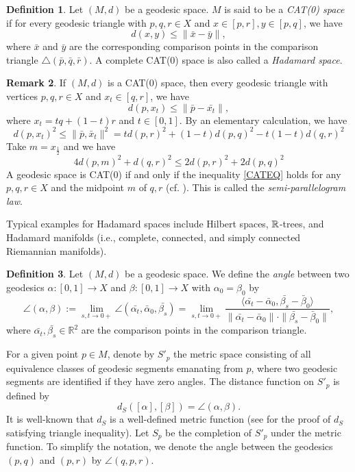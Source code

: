 \documentclass[11pt]{article}
\theoremstyle{definition}
\newtheorem{Def}{Definition}[section]
\newtheorem{Rem}[Def]{Remark}
\theoremstyle{plain}
\begin{document}
\begin{Def}
Let $(M,d)$ be a geodesic space. $M$ is said to be a \emph{CAT(0) space} if for every geodesic triangle with $p,q,r\in X$ and $x\in[p,r],y\in[p,q]$, we have
$$d(x,y)\leq\|\bar x-\bar y\|,$$
where $\bar x$ and $\bar y$ are the corresponding comparison points in the comparison triangle $\triangle(\bar p,\bar q,\bar r)$. A complete CAT(0) space is also called a \emph{Hadamard space}.
\end{Def}

\begin{Rem}
If $(M,d)$ is a CAT(0) space, then every geodesic triangle with vertices $p,q,r\in X$ and $x_t\in[q,r]$, we have
$$d(p,x_t)\leq\|\bar p-\bar{x_t}\|,$$
where $x_t=tq+(1-t)r$ and $t\in[0,1]$. By an elementary calculation, we have
$$d(p,x_t)^2\leq \|\bar p,\bar x_t\|^2=td(p,r)^2+(1-t)d(p,q)^2-t(1-t)d(q,r)^2$$
Take $m=x_{\frac12}$ and we have
\begin{equation}\label{CATEQ}4d(p,m)^2+d(q,r)^2\leq 2d(p,r)^2+2d(p,q)^2\end{equation}
A geodesic space is CAT(0) if and only if the inequality \eqref{CATEQ} holds for any $p,q,r\in X$ and the midpoint $m$ of $q,r$ (cf. \cite{Hadamard1999}). This is called the \emph{semi-parallelogram law}.
\end{Rem}

Typical examples for Hadamard spaces include Hilbert spaces, $\mathbb R$-trees, and Hadamard manifolds (i.e., complete, connected, and simply connected Riemannian manifolds).

\begin{Def}
Let $(M,d)$ be a geodesic space. We define the \emph{angle} between two geodesics $\alpha:[0,1]\to X$ and $\beta:[0,1]\to X$ with $\alpha_0=\beta_0$ by
$$\angle(\alpha,\beta):=\lim_{s,t\to 0+}\angle(\bar{\alpha_t},\bar\alpha_0,\bar{\beta_s})=\lim_{s,t\to 0+}\frac{\langle\bar{\alpha_t}-\bar\alpha_0,\bar{\beta_s}-\bar\beta_0\rangle}{\|\bar{\alpha_t}-\bar\alpha_0\|\cdot\|\bar{\beta_s}-\bar\beta_0\|},$$
where $\bar{\alpha_t},\bar{\beta_s}\in\mathbb{R}^2$ are the comparison points in the comparison triangle.
\end{Def}

For a given point $p\in M$, denote by $S'_p$ the metric space consisting of all equivalence classes of geodesic segments emanating from $p$, where two geodesic segments are identified if they have zero angles. The distance function on $S'_p$ is defined by
$$d_S([\alpha],[\beta])=\angle(\alpha,\beta).$$
It is well-known that $d_S$ is a well-defined metric function (see \cite[Lemma 1.1.4]{Hadamard1999} for the proof of $d_S$ satisfying triangle inequality). Let $S_p$ be the completion of $S'_p$ under the metric function. To simplify the notation, we denote the angle between the geodesics $(p,q)$ and $(p,r)$ by $\angle(q,p,r)$.
\end{document}
